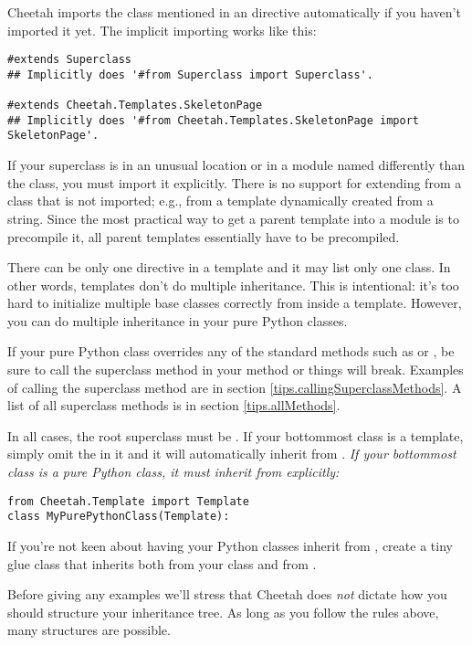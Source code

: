 Cheetah imports the class mentioned in an  directive
automatically if you haven't imported it yet.  The implicit importing works
like this:

\begin{verbatim}
#extends Superclass   
## Implicitly does '#from Superclass import Superclass'.

#extends Cheetah.Templates.SkeletonPage
## Implicitly does '#from Cheetah.Templates.SkeletonPage import SkeletonPage'.
\end{verbatim}

If your superclass is in an unusual location or in a module named 
differently than the class, you must import it explicitly.  There is no
support for extending from a class that is not imported; e.g., from a template
dynamically created from a string.  Since the most practical way to
get a parent template into a module is to precompile it, all parent templates
essentially have to be precompiled.  

There can be only one  directive in a template and it
may list only one class.  In other words, templates don't do multiple
inheritance.  This is intentional: it's too hard to initialize multiple
base classes correctly from inside a template.  However, you can do
multiple inheritance in your pure Python classes.

If your pure Python class overrides any of the standard 
methods such as  or , be sure to call
the superclass method in your method or things will break.  Examples of calling
the superclass method are in section \ref{tips.callingSuperclassMethods}.
A list of all superclass methods is in section 
\ref{tips.allMethods}.

In all cases, the root superclass must be .  If your
bottommost class is a template, simply omit the  in it and it
will automatically inherit from .  {\em If your bottommost class
is a pure Python class, it must inherit from  explicitly: }
\begin{verbatim}
from Cheetah.Template import Template
class MyPurePythonClass(Template):
\end{verbatim}

If you're not keen about having your Python classes inherit from
, create a tiny glue class that inherits both from your
class and from .

Before giving any examples we'll stress that Cheetah does {\em not}
dictate how you should structure your inheritance tree.  As long as
you follow the rules above, many structures are possible.

